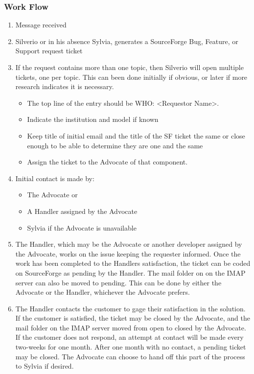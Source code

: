 \subsubsection{Work Flow}
\begin{enumerate}
\item Message received
\item Silverio or in his absence Sylvia, generates a SourceForge Bug, Feature, or Support request ticket
\item If the request contains more than one topic, then Silverio will open multiple tickets, one per topic. This can been done
initially if obvious, or later if more research indicates it is necessary. 

\begin{itemize}
\item The top line of the entry should be WHO: <Requestor Name>.
\item Indicate the institution and model if known
\item Keep title of initial email and the title of the SF ticket the
same or close enough to be able to determine they are one and the same
\item Assign the ticket to the Advocate of that component. 
\end{itemize}

\item Initial contact is made by:

\begin{itemize}
\item The Advocate or
\item A Handler assigned by the Advocate
\item Sylvia if the Advocate is unavailable
\end{itemize}

\item The Handler, which may be the Advocate or another developer assigned by the Advocate, works on the issue keeping the requester informed. Once the work has been completed to the Handlers satisfaction, the ticket can be coded on SourceForge as pending by the Handler.  The mail folder on 
on the IMAP server can also be moved to pending. This can be done by either the Advocate or the Handler, whichever the Advocate prefers.

\item The Handler contacts the customer to gage their satisfaction in the solution. If the customer is satisfied, the ticket may be closed by the Advocate, and the mail folder on the IMAP server moved from open to 
closed by the Advocate.  If the customer does not respond, an attempt at contact will be made every two-weeks for one month.  After one month with no contact, a pending ticket may be closed. The Advocate can choose to hand off this part of the process to Sylvia if desired. 
\end{enumerate}


